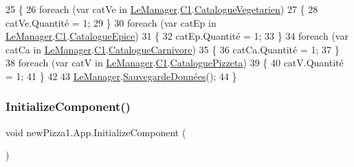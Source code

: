 \begin{DoxyCode}
25         \{
26             \textcolor{keywordflow}{foreach} (var catVe \textcolor{keywordflow}{in} \hyperlink{classnewPizza1_1_1App_a40f3adef1e0176c5730f8d9ba525c010}{LeManager}.\hyperlink{classModele_1_1Manager_a54bbc7bd646fcaa0f1a590310dd3c02c}{C1}.\hyperlink{classModele_1_1Catalogue_abd7d6d70ddd6ba264c1c91a5b084d9ba}{CatalogueVegetarien})
27             \{
28                 catVe.Quantité = 1;
29             \}
30             \textcolor{keywordflow}{foreach} (var catEp \textcolor{keywordflow}{in} \hyperlink{classnewPizza1_1_1App_a40f3adef1e0176c5730f8d9ba525c010}{LeManager}.\hyperlink{classModele_1_1Manager_a54bbc7bd646fcaa0f1a590310dd3c02c}{C1}.\hyperlink{classModele_1_1Catalogue_a633610212f42551a5755212e21bedbca}{CatalogueEpice})
31             \{
32                 catEp.Quantité = 1;
33             \}
34             \textcolor{keywordflow}{foreach} (var catCa \textcolor{keywordflow}{in} \hyperlink{classnewPizza1_1_1App_a40f3adef1e0176c5730f8d9ba525c010}{LeManager}.\hyperlink{classModele_1_1Manager_a54bbc7bd646fcaa0f1a590310dd3c02c}{C1}.\hyperlink{classModele_1_1Catalogue_a4af9ef768f67cef6dfe545e22a6d63af}{CatalogueCarnivore})
35             \{
36                 catCa.Quantité = 1;
37             \}
38             \textcolor{keywordflow}{foreach} (var catV \textcolor{keywordflow}{in} \hyperlink{classnewPizza1_1_1App_a40f3adef1e0176c5730f8d9ba525c010}{LeManager}.\hyperlink{classModele_1_1Manager_a54bbc7bd646fcaa0f1a590310dd3c02c}{C1}.\hyperlink{classModele_1_1Catalogue_ac5490e1026b5b08d43e30b68da893423}{CataloguePizzeta})
39             \{
40                 catV.Quantité = 1;
41             \}
42 
43             \hyperlink{classnewPizza1_1_1App_a40f3adef1e0176c5730f8d9ba525c010}{LeManager}.\hyperlink{classModele_1_1Manager_a1401389e33f047e9fd896ee0383fd01f}{SauvegardeDonnées}();
44         \}
\end{DoxyCode}
\mbox{\label{classnewPizza1_1_1App_a437c6582c386ee3f9ee1419133aae6be}} 
\subsubsection{\texorpdfstring{Initialize\+Component()}{InitializeComponent()}\hspace{0.1cm}{\footnotesize\ttfamily [1/2]}}
{\footnotesize\ttfamily void new\+Pizza1.\+App.\+Initialize\+Component (\begin{DoxyParamCaption}{ }\end{DoxyParamCaption})\hspace{0.3cm}{\ttfamily [inline]}}



